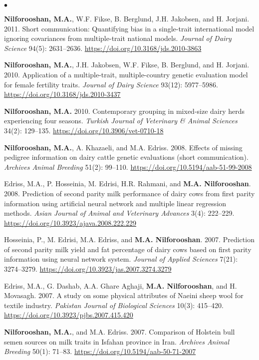 \documentclass[margin,line]{res}
\newenvironment{list2}{
  \begin{list}{$\bullet$}{%
    \setlength{\itemsep}{0in}
    \setlength{\parsep}{0in} \setlength{\parskip}{0in}
    \setlength{\topsep}{0in} \setlength{\partopsep}{0in}
    \setlength{\leftmargin}{0.2in}}}
  {\end{list}}
\begin{document}
\begin{resume}
\begin{list2}
    \item {\bf Nilforooshan, M.A.}, W.F. Fikse, B. Berglund, J.H. Jakobsen, and H. Jorjani. 2011. Short communication: Quantifying bias in a single-trait international model ignoring covariances from multiple-trait national models. {\em Journal of Dairy Science} 94(5): 2631--2636. \url{https://doi.org/10.3168/jds.2010-3863}
    \item {\bf Nilforooshan, M.A.}, J.H. Jakobsen, W.F. Fikse, B. Berglund, and H. Jorjani. 2010. Application of a multiple-trait, multiple-country genetic evaluation model for female fertility traits. {\em Journal of Dairy Science} 93(12): 5977--5986. \url{https://doi.org/10.3168/jds.2010-3437}
    \item {\bf Nilforooshan, M.A.} 2010. Contemporary grouping in mixed-size dairy herds experiencing four seasons. {\em Turkish Journal of Veterinary \& Animal Sciences} 34(2): 129--135. \url{https://doi.org/10.3906/vet-0710-18}
    \item {\bf Nilforooshan, M.A.}, A. Khazaeli, and M.A. Edriss. 2008. Effects of missing pedigree information on dairy cattle genetic evaluations (short communication). {\em Archives Animal Breeding} 51(2): 99--110. \url{https://doi.org/10.5194/aab-51-99-2008}
    \item Edriss, M.A., P. Hosseinia, M. Edrisi, H.R. Rahmani, and {\bf M.A. Nilforooshan}. 2008. Prediction of second parity milk performance of dairy cows from first parity information using artificial neural network and multiple linear regression methods. {\em Asian Journal of Animal and Veterinary Advances} 3(4): 222--229. \url{https://doi.org/10.3923/ajava.2008.222.229}
    \item Hosseinia, P., M. Edrisi, M.A. Edriss, and {\bf M.A. Nilforooshan}. 2007. Prediction of second parity milk yield and fat percentage of dairy cows based on first parity information using neural network system. {\em Journal of Applied Sciences} 7(21): 3274--3279. \url{https://doi.org/10.3923/jas.2007.3274.3279}
    \item Edriss, M.A., G. Dashab, A.A. Ghare Aghaji, {\bf M.A. Nilforooshan}, and H. Movasagh. 2007. A study on some physical attributes of Naeini sheep wool for textile industry. {\em Pakistan Journal of Biological Sciences} 10(3): 415--420. \url{https://doi.org/10.3923/pjbs.2007.415.420}
    \item {\bf Nilforooshan, M.A.}, and M.A. Edriss. 2007. Comparison of Holstein bull semen sources on milk traits in Isfahan province in Iran. {\em Archives Animal Breeding} 50(1): 71--83. \url{https://doi.org/10.5194/aab-50-71-2007}

\end{list2}
\end{resume}
\end{document}

